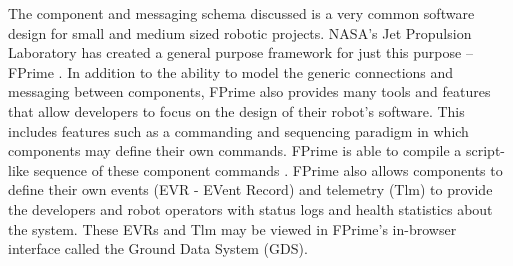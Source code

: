 \documentclass{article}
\begin{document}
The component and messaging schema discussed is a very common software design for small and medium sized robotic projects. NASA's Jet Propulsion Laboratory has created a general purpose framework for just this purpose -- FPrime \cite{b4}. In addition to the ability to model the generic connections and messaging between components, FPrime also provides many tools and features that allow developers to focus on the design of their robot's software. This includes features such as a commanding and sequencing paradigm in which components may define their own commands. FPrime is able to compile a script-like sequence of these component commands \cite{b4}. FPrime also allows components to define their own events (EVR - EVent Record) and telemetry (Tlm) to provide the developers and robot operators with status logs and health statistics about the system. These EVRs and Tlm may be viewed in FPrime's in-browser interface called the Ground Data System (GDS).

\end{document}

